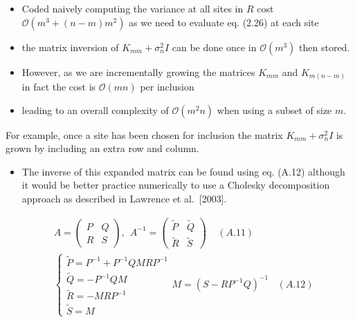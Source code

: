 \documentclass[
  ignorenonframetext,
]{beamer}
\providecommand{\tightlist}{%
  \setlength{\itemsep}{0pt}\setlength{\parskip}{0pt}}
\begin{document}
\begin{frame}{}
\protect\hypertarget{section-17}{}
\begin{itemize}
\item
  Coded naively computing the variance at all sites in \(R\) cost
  \(\mathcal O(m^3 + (n - m)m^2)\) as we need to evaluate eq. (2.26) at
  each site
\item
  the matrix inversion of \(K_{mm} + \sigma_n^2 I\) can be done once in
  \(\mathcal O(m^3)\) then stored.
\item
  However, as we are incrementally growing the matrices \(K_{mm}\) and
  \(K_{m(n-m)}\) in fact the cost is \(\mathcal O(mn)\) per inclusion
\item
  leading to an overall complexity of \(\mathcal O(m^2n)\) when using a
  subset of size \(m\).
\end{itemize}
\end{frame}

\begin{frame}{}
\protect\hypertarget{section-18}{}
For example, once a site has been chosen for inclusion the matrix
\(K_{mm} + \sigma_n^2I\) is grown by including an extra row and column.

\begin{itemize}
\tightlist
\item
  The inverse of this expanded matrix can be found using eq. (A.12)
  although it would be better practice numerically to use a Cholesky
  decomposition approach as described in Lawrence et al.~{[}2003{]}.
\end{itemize}

\[
\begin{split}
& A= 
\begin{pmatrix}
P & Q\\
R & S
\end{pmatrix},\ \
A^{-1}= 
\begin{pmatrix}
\tilde P & \tilde Q\\
\tilde R & \tilde S
\end{pmatrix} \ \ \ \ \ (A.11)\\
& \begin{cases}
\tilde P = P^{-1} + P^{-1}QMRP^{-1}\\
\tilde Q=-P^{-1}QM\\
\tilde R = -MRP^{-1}\\
\tilde S = M
\end{cases}
M = (S-RP^{-1}Q)^{-1} \ \ \ \ (A. 12)
\end{split}
\]
\end{frame}
\end{document}
